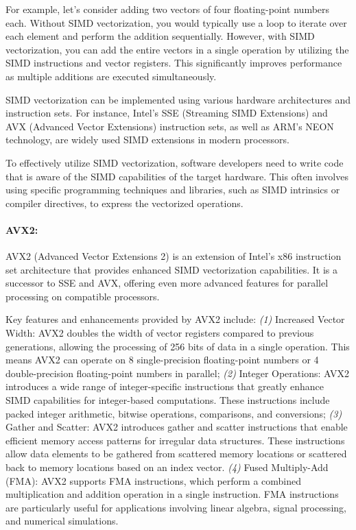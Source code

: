 For example, let's consider adding two vectors of four floating-point numbers
each. Without SIMD vectorization, you would typically use a loop to iterate
over each element and perform the addition sequentially. However, with SIMD
vectorization, you can add the entire vectors in a single operation by
utilizing the SIMD instructions and vector registers. This significantly
improves performance as multiple additions are executed simultaneously.

SIMD vectorization can be implemented using various hardware architectures and
instruction sets. For instance, Intel's SSE (Streaming SIMD Extensions) and AVX
(Advanced Vector Extensions) instruction sets, as well as ARM's NEON
technology, are widely used SIMD extensions in modern processors.

To effectively utilize SIMD vectorization, software developers need to write
code that is aware of the SIMD capabilities of the target hardware. This often
involves using specific programming techniques and libraries, such as SIMD
intrinsics or compiler directives, to express the vectorized operations.

\paragraph{AVX2:}
AVX2 (Advanced Vector Extensions 2) is an extension of Intel's x86 instruction
set architecture that provides enhanced SIMD vectorization capabilities. It is
a successor to SSE and AVX, offering even more advanced features for parallel
processing on compatible processors.

Key features and enhancements provided by AVX2 include:
\emph{(1)} Increased Vector Width: AVX2 doubles the width of vector registers
compared to previous generations, allowing the processing of 256 bits of data
in a single operation. This means AVX2 can operate on 8 single-precision
floating-point numbers or 4 double-precision floating-point numbers in
parallel;
\emph{(2)} Integer Operations: AVX2 introduces a wide range of integer-specific
instructions that greatly enhance SIMD capabilities for integer-based
computations. These instructions include packed integer arithmetic, bitwise
operations, comparisons, and conversions;
\emph{(3)} Gather and Scatter: AVX2 introduces gather and scatter instructions
that enable efficient memory access patterns for irregular data structures.
These instructions allow data elements to be gathered from scattered memory
locations or scattered back to memory locations based on an index vector.
\emph{(4)} Fused Multiply-Add (FMA): AVX2 supports FMA instructions, which
perform a combined multiplication and addition operation in a single
instruction. FMA instructions are particularly useful for applications
involving linear algebra, signal processing, and numerical simulations.
